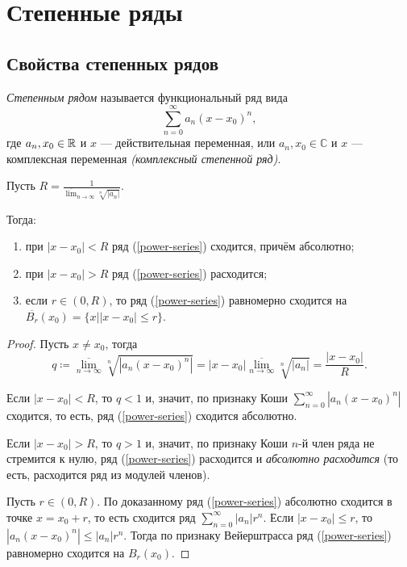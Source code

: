 \section{Степенные ряды}
\subsection{Свойства степенных рядов}

\begin{definition}
    \emph{Степенным рядом} называется функциональный ряд вида
    \begin{equation}
        \label{power-series}
        \sum_{n = 0}^\infty a_n (x - x_0)^n,
    \end{equation}
    где $a_n, x_0 \in \mathbb{R}$ и $x$ --- действительная переменная, или $a_n, x_0 \in \mathbb{C}$ и $x$ --- комплексная переменная \emph{(комплексный степенной ряд)}.
\end{definition}


\begin{theorem}
    \label{cauchy-hadamard}
    Пусть $R = \frac{1}{\overline{\lim}_{n \rightarrow \infty} \sqrt[n]{|a_n|}}$.

    Тогда:
    \begin{enumerate}
        \item при $|x - x_0| < R$ ряд (\ref{power-series}) сходится, причём абсолютно;
        \item при $|x - x_0| > R$ ряд (\ref{power-series}) расходится;
        \item если $r \in (0, R)$, то ряд (\ref{power-series}) равномерно сходится на $\overline{B_r}(x_0) = \{x | |x - x_0| \le r\}$.
    \end{enumerate}

    \begin{proof}
        Пусть $x \neq x_0$, тогда
        \[
            q \coloneqq \overline{\lim_{n \rightarrow \infty}} \sqrt[n]{|a_n (x - x_0)^n|} = |x - x_0| \overline{\lim_{n \rightarrow \infty}} \sqrt[n]{|a_n|} = \frac{|x - x_0|}{R}.
        \]

        Если $|x - x_0| < R$, то $q < 1$ и, значит, по признаку Коши $\sum_{n = 0}^\infty |a_n (x - x_0)^n|$ сходится, то есть, ряд (\ref{power-series}) сходится абсолютно.

        Если $|x - x_0| > R$, то $q > 1$ и, значит, по признаку Коши $n$-й член ряда не стремится к нулю, ряд (\ref{power-series}) расходится и \emph{абсолютно расходится} (то есть, расходится ряд из модулей членов).

        Пусть $r \in (0, R)$. По доказанному ряд (\ref{power-series}) абсолютно сходится в точке $x = x_0 + r$, то есть сходится ряд $\sum_{n = 0}^\infty |a_n|r^n$. Если $|x - x_0| \le r$, то $|a_n (x - x_0)^n| \le |a_n| r^n$. Тогда по признаку Вейерштрасса ряд (\ref{power-series}) равномерно сходится на $B_r(x_0)$.
    \end{proof}
\end{theorem}

